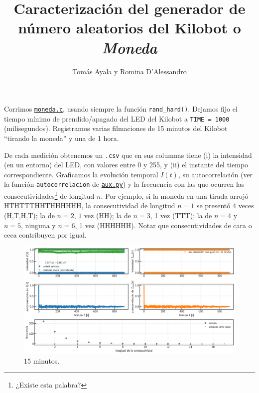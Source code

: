 \documentclass[a4paper]{article}
\title{\large{\textbf{Caracterización del generador de número aleatorios del Kilobot o \emph{Moneda}}}}
\author{%
	\normalsize{Tomás Ayala y Romina D'Alessandro}
}
\date{}
\begin{document}
	
\maketitle

Corrimos \href{https://github.com/rldromina/Kilobots/blob/tom/Moneda/moneda.c}{\texttt{moneda.c}}, usando siempre la función \texttt{rand\_hard()}.
Dejamos fijo el tiempo mínimo de prendido/apagado del LED del Kilobot a \texttt{TIME = 1000} (milisegundos).
Registramos varias filmaciones de 15 minutos del Kilobot ``tirando la moneda'' y una de 1 hora.

De cada medición obtenemos un \texttt{.csv} que en sus columnas tiene (i) la intensidad (en un entorno) del LED, con valores entre 0 y 255, y (ii) el instante del tiempo correspondiente. Graficamos la evolución temporal $I(t)$, su autocorrelación (ver la función \texttt{autocorrelacion} de \href{https://github.com/rldromina/Kilobots/blob/tom/Moneda/aux.py}{\texttt{aux.py}}) y la frecuencia con las que ocurren las consecutividades\footnote{¿Existe esta palabra?} de longitud $n$. Por ejemplo, si la moneda en una tirada arrojó HTHTTTHHTHHHHHH, la consecutividad de longitud $n=1$ se presentó $4$ veces (H,T,H,T); la de $n=2$, $1$ vez (HH); la de $n=3$, 1 vez (TTT); la de $n=4$ y $n=5$, ninguna y $n=6$, 1 vez (HHHHHH). Notar que consecutividades de cara o ceca contribuyen por igual.

\begin{figure}[!h]
	\centering
	\includegraphics[width=\linewidth]{Resultados/15min_b.pdf}
	\caption{15 minutos.}
\end{figure}
\end{document}
